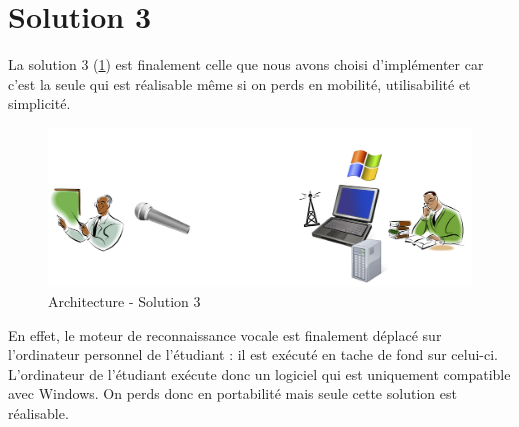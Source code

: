 \section{Solution 3}
La solution 3 (\ref{fig:solution3}) est finalement celle que nous avons choisi d'implémenter car c'est la seule qui est réalisable même si on perds en mobilité, utilisabilité et simplicité.

\begin{figure}[h]
 \centering
 \includegraphics[scale=0.5]{./img/solution3.png}
 \caption{Architecture - Solution 3}
 \label{fig:solution3}
\end{figure}


En effet, le moteur de reconnaissance vocale est finalement déplacé sur l'ordinateur personnel de l'étudiant : il est exécuté en tache de fond sur celui-ci. L'ordinateur de l'étudiant exécute donc un logiciel qui est uniquement compatible avec Windows. On perds donc en portabilité mais seule cette solution est réalisable.
